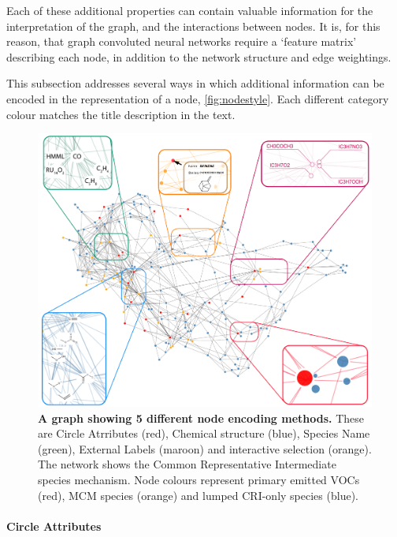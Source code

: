 Each of these additional properties can contain valuable information for the interpretation of the graph, and the interactions between nodes. It is, for this reason, that graph convoluted neural networks \citep{t2gcn} require a  `feature matrix' describing each node, in addition to the network structure and edge weightings.

This subsection addresses several ways in which additional information can be encoded in the representation of a node, \autoref{fig:nodestyle}. Each different category colour matches the title description in the text.


\begin{figure}[H]
     \centering
     \includegraphics[width=\textwidth]{figures_c1/NODES_001f3d-00775b-ff9000-f71735-c10053.pdf}
        \caption{\textbf{A graph showing 5 different node encoding methods.} These are Circle Atrributes (red), Chemical structure (blue), Species Name (green), External Labels (maroon) and interactive selection (orange). The network shows the Common Representative Intermediate species \citep{cri} mechanism. Node colours represent primary emitted VOCs (red), MCM species (orange) and lumped CRI-only species (blue).  }
      \label{fig:nodestyle}
\end{figure}





\paragraph*{\color{c4}Circle Attributes}

